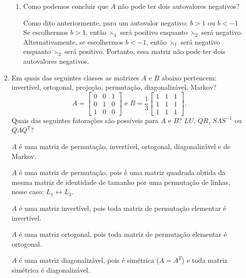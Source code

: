 \documentclass[leqno]{article}
\numberwithin{equation}{section}
\begin{document}
\begin{enumerate}
\begin{enumerate}
			\item Como podemos concluir que $A$ não pode ter dois autovalores negativos?
			
			\begin{sol} 
				Como dito anteriormente, para um autovalor negativo: $b > 1$ ou $b < -1$
				Se escolhermos $b > 1$, então $\leftthreetimes_1$ será
				positivo enquanto $\leftthreetimes_2$ será negativo. Alternativamente, se escolhermos
				$b <$$-1$, então $\leftthreetimes_1$ será negativo enquanto $\leftthreetimes_2$ será
				positivo. Portanto, essa matriz não pode ter dois autovalores negativos.    
			\end{sol} 
			
		\end{enumerate}
		
		
		\item Em quais das seguintes classes as matrizes $A$ e $B$ abaixo pertencem: invertível, ortogonal, projeção, permutação, diagonalizável, Markov?
		$$A = \begin{bmatrix}
			0 & 0 & 1 \\
			0 & 1 & 0 \\
			1 & 0 & 0
		\end{bmatrix} \mbox{ e } B = \frac{1}{3}\begin{bmatrix}
			1 & 1 & 1 \\
			1 & 1 & 1 \\
			1 & 1 & 1
		\end{bmatrix}.$$
		Quais das seguintes fatorações são possíveis para $A$ e $B$? $LU$, $QR$, $S\Lambda S^{-1}$ ou $Q\Lambda Q^T$?
		
		\begin{sol} 
			$A$ é uma matriz de permutação, invertível, ortogonal, diagonalizável e de Markov.
			
			$A$ é uma matriz de permutação, pois é uma matriz quadrada obtida da mesma matriz de identidade de tamanho por uma permutação de linhas, nesse caso: $L_1 \longleftrightarrow L_3$.
			
			$A$ é uma matriz invertível, pois toda matriz de permutação elementar é invertível.
			
			$A$ é uma matriz ortogonal, pois toda matriz de permutação elementar é ortogonal.
			
			$A$ é uma matriz diagonalizável, pois é simétrica ($A = A^T$) e toda matriz simétrica é diagonalizável.
			

\end{sol}
\end{enumerate}
\end{document}
